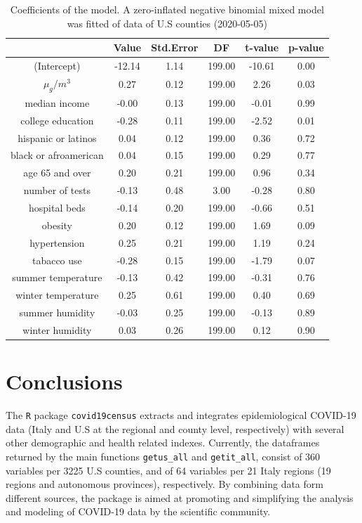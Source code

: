 \documentclass[12pt,halfline,a4paper,]{ouparticle}
\begin{document}
\begin{table}[ht]
\centering
\begin{tabular}{cccccc}
  \hline
 & Value & Std.Error & DF & t-value & p-value \\ 
  \hline
(Intercept) & -12.14 & 1.14 & 199.00 & -10.61 & 0.00 \\ 
  $\mu_g/m^3$ & 0.27 & 0.12 & 199.00 & 2.26 & 0.03 \\ 
  median income & -0.00 & 0.13 & 199.00 & -0.01 & 0.99 \\ 
  college education & -0.28 & 0.11 & 199.00 & -2.52 & 0.01 \\ 
  hispanic or latinos & 0.04 & 0.12 & 199.00 & 0.36 & 0.72 \\ 
  black or afroamerican & 0.04 & 0.15 & 199.00 & 0.29 & 0.77 \\ 
  age 65 and over & 0.20 & 0.21 & 199.00 & 0.96 & 0.34 \\ 
  number of tests & -0.13 & 0.48 & 3.00 & -0.28 & 0.80 \\ 
  hospital beds & -0.14 & 0.20 & 199.00 & -0.66 & 0.51 \\ 
  obesity & 0.20 & 0.12 & 199.00 & 1.69 & 0.09 \\ 
  hypertension & 0.25 & 0.21 & 199.00 & 1.19 & 0.24 \\ 
  tabacco use & -0.28 & 0.15 & 199.00 & -1.79 & 0.07 \\ 
  summer temperature & -0.13 & 0.42 & 199.00 & -0.31 & 0.76 \\ 
  winter temperature & 0.25 & 0.61 & 199.00 & 0.40 & 0.69 \\ 
  summer humidity & -0.03 & 0.25 & 199.00 & -0.13 & 0.89 \\ 
  winter humidity & 0.03 & 0.26 & 199.00 & 0.12 & 0.90 \\ 
   \hline
\end{tabular}
\caption{Coefficients of the model. A zero-inflated negative binomial mixed model was fitted of data of U.S counties (2020-05-05)} 
\label{tab:tab_coef}
\end{table}

\hypertarget{conclusions}{%
\section{Conclusions}\label{conclusions}}

The \texttt{R} package \texttt{covid19census} extracts and integrates
epidemiological COVID-19 data (Italy and U.S at the regional and county
level, respectively) with several other demographic and health related
indexes. Currently, the dataframes returned by the main functions
\texttt{getus\_all} and \texttt{getit\_all}, consist of 360 variables
per 3225 U.S counties, and of 64 variables per 21 Italy regions (19
regions and autonomous provinces), respectively. By combining data form
different sources, the package is aimed at promoting and simplifying the
analysis and modeling of COVID-19 data by the scientific community.
\end{document}
